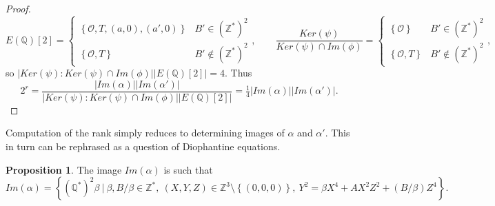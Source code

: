 \documentclass{article}
\newcommand{\Z}{\mathbb{Z}}
\newcommand{\Q}{\mathbb{Q}}
\newcommand{\rb}[1]{\left( #1 \right)}
\renewcommand{\sb}[1]{\left[ #1 \right]}
\newcommand{\cb}[1]{\left\{ #1 \right\}}
\newcommand{\abs}[1]{\left\lvert #1 \right\rvert}
\theoremstyle{definition}
\newtheorem{proposition}{Proposition}[subsection]
\begin{document}
\begin{proof}
$$ E\rb{\Q}\sb{2} = \begin{cases} \cb{\mathcal{O}, T, \rb{a, 0}, \rb{a', 0}} & B' \in \rb{\Z^*}^2 \\ \cb{\mathcal{O}, T} & B' \notin \rb{\Z^*}^2 \end{cases}, \qquad \dfrac{Ker\rb{\psi}}{Ker\rb{\psi} \cap Im\rb{\phi}} = \begin{cases} \cb{\mathcal{O}} & B' \in \rb{\Z^*}^2 \\ \cb{\mathcal{O}, T} & B' \notin \rb{\Z^*}^2 \end{cases}, $$
so $ \abs{Ker\rb{\psi} : Ker\rb{\psi} \cap Im\rb{\phi}}\abs{E\rb{\Q}\sb{2}} = 4 $. Thus
$$ 2^r = \dfrac{\abs{Im\rb{\alpha}}\abs{Im\rb{\alpha'}}}{\abs{Ker\rb{\psi} : Ker\rb{\psi} \cap Im\rb{\phi}}\abs{E\rb{\Q}\sb{2}}} = \tfrac{1}{4}\abs{Im\rb{\alpha}}\abs{Im\rb{\alpha'}}. $$
\end{proof}

Computation of the rank simply reduces to determining images of $ \alpha $ and $ \alpha' $. This in turn can be rephrased as a question of Diophantine equations.

\begin{proposition}
The image $ Im\rb{\alpha} $ is such that
$$ Im\rb{\alpha} = \cb{\rb{\Q^*}^2\beta \ \Big| \ \beta, B / \beta \in \Z^*, \ \rb{X, Y, Z} \in \Z^3 \setminus \cb{\rb{0, 0, 0}}, \ Y^2 = \beta X^4 + AX^2Z^2 + \rb{B / \beta}Z^4}. $$
\end{proposition}
\end{document}
